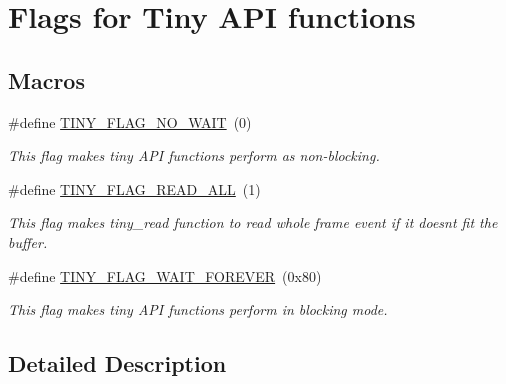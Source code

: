 \hypertarget{group__FLAGS__GROUP}{}\section{Flags for Tiny A\+P\+I functions}
\label{group__FLAGS__GROUP}
\subsection*{Macros}
\begin{DoxyCompactItemize}
\item 
\hypertarget{group__FLAGS__GROUP_gadadd60eb21d7949e6d097ad36aab9b2e}{}\#define \hyperlink{group__FLAGS__GROUP_gadadd60eb21d7949e6d097ad36aab9b2e}{T\+I\+N\+Y\+\_\+\+F\+L\+A\+G\+\_\+\+N\+O\+\_\+\+W\+A\+I\+T}~(0)\label{group__FLAGS__GROUP_gadadd60eb21d7949e6d097ad36aab9b2e}

\begin{DoxyCompactList}\small\item\em This flag makes tiny A\+P\+I functions perform as non-\/blocking. \end{DoxyCompactList}\item 
\hypertarget{group__FLAGS__GROUP_gae41123cfeed375e618a4152c9bbd0d6d}{}\#define \hyperlink{group__FLAGS__GROUP_gae41123cfeed375e618a4152c9bbd0d6d}{T\+I\+N\+Y\+\_\+\+F\+L\+A\+G\+\_\+\+R\+E\+A\+D\+\_\+\+A\+L\+L}~(1)\label{group__FLAGS__GROUP_gae41123cfeed375e618a4152c9bbd0d6d}

\begin{DoxyCompactList}\small\item\em This flag makes tiny\+\_\+read function to read whole frame event if it doesn\textquotesingle{}t fit the buffer. \end{DoxyCompactList}\item 
\hypertarget{group__FLAGS__GROUP_ga3a34267804581c5709d03f52d232b307}{}\#define \hyperlink{group__FLAGS__GROUP_ga3a34267804581c5709d03f52d232b307}{T\+I\+N\+Y\+\_\+\+F\+L\+A\+G\+\_\+\+W\+A\+I\+T\+\_\+\+F\+O\+R\+E\+V\+E\+R}~(0x80)\label{group__FLAGS__GROUP_ga3a34267804581c5709d03f52d232b307}

\begin{DoxyCompactList}\small\item\em This flag makes tiny A\+P\+I functions perform in blocking mode. \end{DoxyCompactList}\end{DoxyCompactItemize}


\subsection{Detailed Description}
